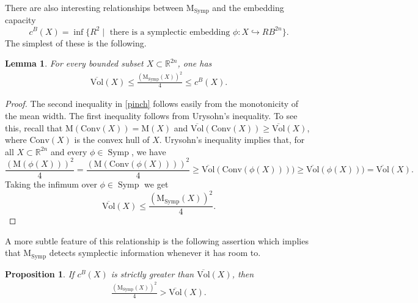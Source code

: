 \documentclass[12pt]{amsart}
\newtheorem{proposition}[theorem]{Proposition}
\newtheorem{lemma}[theorem]{Lemma}
\theoremstyle{definition}
\newcommand\Symp{\operatorname{Symp}}
\newcommand{\RR}{{\mathbb R}}
\newcommand{\mw}{{{\mathrm {M}}}}
\newcommand{\nlmw}{\mathrm{M}_{{\Symp}}}
\newcommand{\C}{{\mathrm{Conv}}}
\newcommand{\sv}{{\overline{{\mathrm{Vol}}}}}
\begin{document}
\medskip

There are also interesting relationships between $\nlmw$ and the embedding capacity
$$c^B(X) =\inf\{ R^2 \mid \text{ there is a symplectic embedding } \phi \colon X \hookrightarrow RB^{2n} \}.$$
The simplest of these is the following.

\begin{lemma} For every bounded subset $X\subset \RR^{2n}$, one has
    \begin{align}\label{pinch}
\sv(X)
  \leq \frac{(\nlmw(X))^2}{4} \leq c^B(X).
\end{align}
\end{lemma}

\begin{proof}
The second inequality in \eqref{pinch} follows easily from the monotonicity of the mean width. The first inequality follows from Urysohn's inequality. To see this, recall  that 
$\mw (\C(X)) =\mw (X)$ and $\sv(\C(X)) \geq \sv(X)$, where $\C (X)$ is the convex hull of $X$. Urysohn's inequality implies that, for all $X\subset \RR^{2n}$ and every $\phi \in \Symp$, we have 
$$
\frac{(\mw(\phi(X)))^2}{4} = \frac{(\mw(\C(\phi(X))))^2}{4} \geq \sv(\C(\phi(X)))) \geq \sv(\phi(X))) =\sv(X).
$$
Taking the infimum over $\phi \in \Symp$ we get 
$$
\sv(X)
  \leq \frac{(\nlmw(X))^2}{4}.
$$
\end{proof}


A more subtle feature of this relationship is the following assertion which implies that $\nlmw$ detects symplectic information whenever it has room to.
\begin{proposition}\label{oneside}
 If $c^B(X)$ is strictly greater than $\sv(X)$, then \begin{align*}
  \frac{(\nlmw(X))^2}{4}>\sv(X). 
  \end{align*}
\end{proposition}
\end{document}
